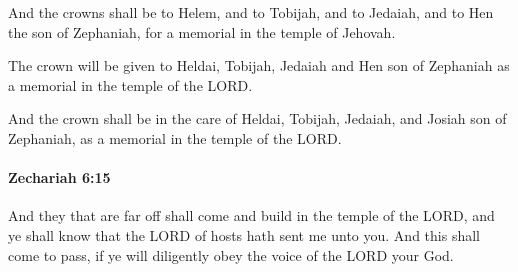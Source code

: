 			\begin{versebox}
					\item[BHS] 
					\item[LXX] 
					\item[ASV] And the crowns shall be to Helem, and to Tobijah, and to Jedaiah, and to Hen the son of Zephaniah, for a memorial in the temple of Jehovah.
					\item[NIV] The crown will be given to Heldai, Tobijah, Jedaiah and Hen son of Zephaniah as a memorial in the temple of the LORD.
					\item[NRSV] And the crown shall be in the care of Heldai, Tobijah, Jedaiah, and Josiah son of Zephaniah, as a memorial in the temple of the LORD.
			\end{versebox}

		\paragraph{Zechariah 6:15} %
			\label{ZECHARIAH-6-15}

			And they that are far off shall come and build in the temple of the LORD, and ye shall know that the LORD of hosts hath sent me unto you. And this shall come to pass, if ye will diligently obey the voice of the LORD your God.

